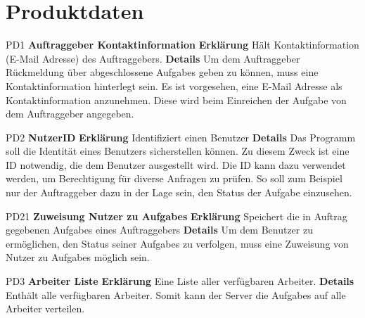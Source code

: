 \documentclass[a4paper,12pt]{article}
\begin{document}
\section{Produktdaten}
\begin{itemize}[nosep]
\leftskip=0.5cm

\begin{minipage}[t]{\linewidth}
\item[PD1] \textbf{Auftraggeber Kontaktinformation}
\subitem \textbf{Erklärung} Hält Kontaktinformation (E-Mail Adresse) des Auftraggebers.
\subitem \textbf{Details} Um dem Auftraggeber Rückmeldung über abgeschlossene \glspl{Aufgabe} geben zu können, muss eine Kontaktinformation hinterlegt sein.\newline
Es ist vorgesehen, eine E-Mail Adresse als Kontaktinformation anzunehmen. Diese wird beim Einreichen der \gls{Aufgabe} von dem Auftraggeber angegeben.
\end{minipage}
\vspace{20mm}

\begin{minipage}[t]{\linewidth}
\item[PD2] \textbf{NutzerID}
\subitem \textbf{Erklärung} Identifiziert einen \gls{Benutzer}
\subitem \textbf{Details} Das Programm soll die Identität eines \gls{Benutzer}s sicherstellen können. Zu diesem Zweck ist eine ID notwendig, die dem \gls{Benutzer} ausgestellt wird.\newline
Die ID kann dazu verwendet werden, um Berechtigung für diverse Anfragen zu prüfen. So soll zum Beispiel nur der Auftraggeber dazu in der Lage sein, den Status der \gls{Aufgabe} einzusehen.
\end{minipage}
\vspace{20mm}

\begin{minipage}[t]{\linewidth}
\item[PD21] \textbf{Zuweisung Nutzer zu \glspl{Aufgabe}}
\subitem \textbf{Erklärung} Speichert die in Auftrag gegebenen \glspl{Aufgabe} eines Auftraggebers
\subitem \textbf{Details} Um dem \gls{Benutzer} zu ermöglichen, den Status seiner \glspl{Aufgabe} zu verfolgen, muss eine Zuweisung von Nutzer zu \glspl{Aufgabe} möglich sein.
\end{minipage}
\vspace{20mm}

\begin{minipage}[t]{\linewidth}
\item[PD3] \textbf{Arbeiter Liste}
\subitem \textbf{Erklärung} Eine Liste aller verfügbaren Arbeiter.
\subitem \textbf{Details} Enthält alle verfügbaren \gls{Arbeiter}.\newline
Somit kann der \gls{Server} die \glspl{Aufgabe} auf alle \gls{Arbeiter} verteilen.
\end{minipage}
\vspace{20mm}


\end{itemize}
\end{document}
